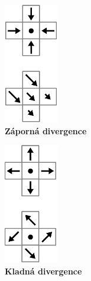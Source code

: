 \begin{figure}[h]
\centering
\begin{subfigure}{.3\textwidth}
  	\centering
	\includegraphics[width=0.35\linewidth]{obrazky-figures/div-negative.png}
	\caption{\textbf{Záporná divergence}}
	\label{fig:Euler}
\end{subfigure}%
\begin{subfigure}{.3\textwidth}
  	\centering
	\includegraphics[width=0.35\linewidth]{obrazky-figures/div-positive.png}
	\caption{\textbf{Kladná divergence}}
	\label{fig:Lagran}
\end{subfigure}
\begin{subfigure}{.3\textwidth}

\end{subfigure}
\end{figure}
